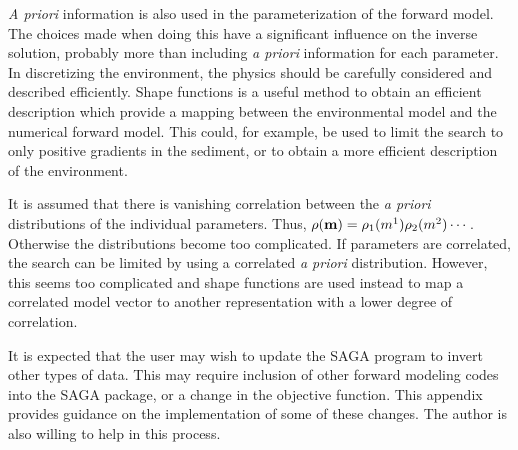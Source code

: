 \documentclass{saclantc}
\begin{document}
{\it A priori} information is also used in the parameterization of the
forward model. The choices made when doing this have a significant influence on
the inverse solution, probably more than including {\it a priori}
information for each parameter. In discretizing the environment, the
physics should be carefully considered and described efficiently.
Shape functions \cite{gerstoft:asa95}
is a useful method to obtain an efficient
description which provide a mapping between the environmental model
and the numerical forward model. This could, for example, be used to limit the
search to only positive gradients in the sediment, or to obtain a
more efficient description of the environment. 

It is assumed that there is
    vanishing correlation between the {\it a priori} distributions
  of the individual parameters.
     Thus, $\rho({\bf m}) = \rho_1(m^1)\rho_2(m^2)\cdots $.
Otherwise the distributions become too
complicated.
If  parameters are correlated, the search can be limited by using 
a correlated  {\it a priori} distribution. 
%
However, this seems too complicated and shape functions
are used instead to map a correlated  model vector to another representation with a
lower degree of correlation.
  



It is expected that the user may  wish to update the {\sf SAGA} program
to invert other types of data. This may require  inclusion of
other forward modeling codes into the {\sf SAGA} package, or a change in
the objective function. 
This appendix provides guidance on the implementation of some of these changes.
The author is also willing to help in this process.
 
\end{document}
